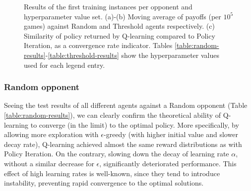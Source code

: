 \begin{figure}[htpb]
\renewcommand*\thesubfigure{\alph{subfigure}}
\centering
\caption{Results of the first training instances per opponent and hyperparameter value set. (a)-(b) Moving average of payoffs (per $10^5$ games) against Random and Threshold agents respectively. (c) Similarity of policy returned by Q-learning compared to Policy Iteration, as a convergence rate indicator. Tables \ref{table:random-results}-\ref{table:threshold-results} show the hyperparameter values used for each legend entry.
}
\label{fig:1}
\end{figure}

\subsubsection{Random opponent}

Seeing the test results of all different agents against a Random opponent (Table \ref{table:random-results}), we can clearly confirm the theoretical ability of Q-learning to converge (in the limit) to the optimal policy. More specifically, by allowing more exploration with $\epsilon$-greedy (with higher initial value and slower decay rate), Q-learning achieved almost the same reward distributions as with Policy Iteration. On the contrary, slowing down the decay of learning rate $\alpha$, without a similar decrease for $\epsilon$, significantly deteriorated performance. This effect of high learning rates is well-known, since they tend to introduce instability, preventing rapid convergence to the optimal solutions.

